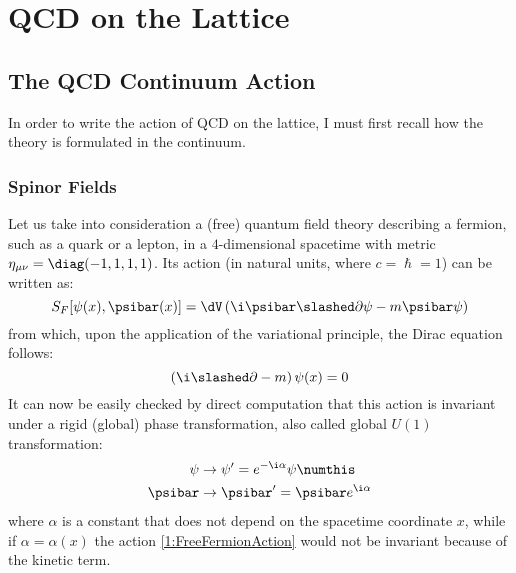 \pagestyle{myFancy}
\chapter{QCD on the Lattice}
\section{The QCD Continuum Action}
In order to write the action of QCD on the lattice, I must first recall how the theory is formulated in the continuum.

\subsection{Spinor Fields}
Let us take into consideration a (free) quantum field theory describing a fermion, such as a quark or a lepton, in a $4$-dimensional spacetime with metric $\eta_{\mu\nu} = \diag(-1,1,1,1)$. Its action (in natural units, where $c = \hslash = 1$) can be written as:
\begin{equation}
      S_F[\psi(x),\psibar(x)] = \dV \left( \i\psibar\slashed\partial\psi - m\psibar\psi \right) \label{1:FreeFermionAction}
\end{equation}
from which, upon the application of the variational principle, the Dirac equation follows:
\begin{equation}
    \left( \i\slashed\partial-m \right) \psi(x) = 0 \label{1:DiracEq}
\end{equation}
It can now be easily checked by direct computation that this action is invariant under a rigid (global) phase transformation, also called global $U(1)$ transformation:
\begin{align*}
    \psi &\rightarrow \psi' = e^{-\i\alpha}\psi \numthis\label{1:PhaseTransform} \\
    \psibar &\rightarrow \psibar' = \psibar e^{\i\alpha}
\end{align*}
where $\alpha$ is a constant that does not depend on the spacetime coordinate $x$, while if $\alpha=\alpha(x)$ the action \eqref{1:FreeFermionAction} would not be invariant because of the kinetic term.

